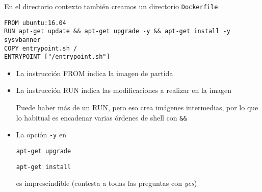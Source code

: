 \documentclass[ucs]{beamer}
\begin{document}
\begin{frame}[fragile]
\frametitle{}
En el 
directorio contexto 
también creamos un directorio
\verb|Dockerfile|

  \begin{scriptsize}
  \begin{verbatim}
FROM ubuntu:16.04
RUN apt-get update && apt-get upgrade -y && apt-get install -y sysvbanner
COPY entrypoint.sh /
ENTRYPOINT ["/entrypoint.sh"]
  \end{verbatim}
  \end{scriptsize}


\begin{itemize}
\item
La instrucción FROM indica la imagen de partida

\item
La instrucción RUN indica las modificaciones a realizar en la imagen

Puede haber más de un RUN, pero eso crea imágenes intermedias, por lo
que lo habitual es encadenar varias órdenes de shell con \verb|&&|

\item
La opción 
\verb|-y|
en

\verb|apt-get upgrade|

\verb|apt-get install| 

es imprescindible (contesta a todas las preguntas con \emph{yes})

\end{itemize}

\end{frame}
\end{document}
